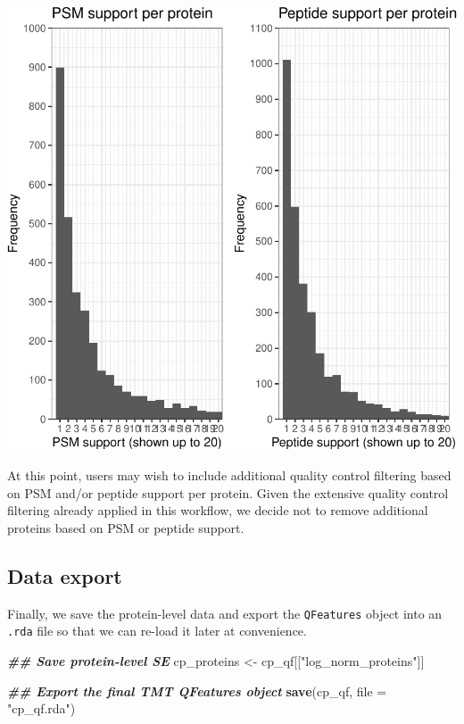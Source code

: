 \documentclass[9pt,a4paper,]{extarticle}
\newenvironment{Shaded}{\begin{snugshade}}{\end{snugshade}}
\newcommand{\AttributeTok}[1]{\textcolor[rgb]{0.13,0.29,0.53}{#1}}
\newcommand{\DocumentationTok}[1]{\textcolor[rgb]{0.56,0.35,0.01}{\textbf{\textit{#1}}}}
\newcommand{\FunctionTok}[1]{\textcolor[rgb]{0.13,0.29,0.53}{\textbf{#1}}}
\newcommand{\NormalTok}[1]{#1}
\newcommand{\OtherTok}[1]{\textcolor[rgb]{0.56,0.35,0.01}{#1}}
\newcommand{\StringTok}[1]{\textcolor[rgb]{0.31,0.60,0.02}{#1}}
\begin{document}
\begin{center}\includegraphics[width=1\linewidth]{workflow_expressions_files/figure-latex/support_plots-1} \end{center}

At this point, users may wish to include additional quality control filtering
based on PSM and/or peptide support per protein. Given the extensive quality
control filtering already applied in this workflow, we decide not to remove
additional proteins based on PSM or peptide support.

\subsection{Data export}\label{data-export}

Finally, we save the protein-level data and export the \texttt{QFeatures} object into
an \texttt{.rda} file so that we can re-load it later at convenience.

\begin{Shaded}
\begin{Highlighting}[]
\DocumentationTok{\#\# Save protein{-}level SE}
\NormalTok{cp\_proteins }\OtherTok{\textless{}{-}}\NormalTok{ cp\_qf[[}\StringTok{"log\_norm\_proteins"}\NormalTok{]]}

\DocumentationTok{\#\# Export the final TMT QFeatures object}
\FunctionTok{save}\NormalTok{(cp\_qf, }\AttributeTok{file =} \StringTok{"cp\_qf.rda"}\NormalTok{)}
\end{Highlighting}
\end{Shaded}
\end{document}
